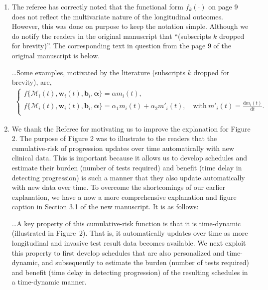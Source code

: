 \begin{enumerate}
\item \textbf{\color{blue}{The functional form $f_k(\cdot)$ on P9 does not reflect the multivariate nature of the longitudinal outcomes.}}

The referee has correctly noted that the functional form $f_k(\cdot)$ on page 9 does not reflect the multivariate nature of the longitudinal outcomes. However, this was done on purpose to keep the notation simple. Although we do notify the readers in the original manuscript that ``(subscripts $k$ dropped for brevity)''. The corresponding text in question from the page 9 of the original manuscript is below.
\begin{shadequote}
\ldots Some examples, motivated by the literature (subscripts $k$ dropped for brevity), are,
\begin{eqnarray*}
\left \{
\begin{array}{l}
f\big\{\mathcal{M}_{i}(t), \boldsymbol{w}_i(t), \boldsymbol{b}_{i}, \boldsymbol{\alpha} \big\} = \alpha m_{i}(t),\\
f\big\{ \mathcal{M}_{i}(t), \boldsymbol{w}_i(t), \boldsymbol{b}_{i}, \boldsymbol{\alpha}\big\} = \alpha_1 m_{i}(t) + \alpha_2 m'_{i}(t),\quad \text{with}\  m'_{i}(t) = \frac{\mathrm{d}{m_{i}(t)}}{\mathrm{d}{t}}.\\
\end{array}
\right.
\end{eqnarray*}
\end{shadequote}

\item \textbf{\color{blue}{Figure 2 is presented without explanation in the main text, besides what appears in the caption. Panel C has no mention even in the caption. It is unclear why it is presented and what message it delivers, if any.}}

We thank the Referee for motivating us to improve the explanation for Figure 2. The purpose of Figure 2 was to illustrate to the readers that the cumulative-risk of progression updates over time automatically with new clinical data. This is important because it allows us to develop schedules and estimate their burden (number of tests required) and benefit (time delay in detecting progression) is such a manner that they also update automatically with new data over time. To overcome the shortcomings of our earlier explanation, we have a now a more comprehensive explanation and figure caption in Section 3.1 of the new manuscript. It is as follows:

\begin{shadequote}
\ldots A key property of this cumulative-risk function is that it is time-dynamic (illustrated in Figure~2). That is, it automatically updates over time as more longitudinal and invasive test result data becomes available. We next exploit this property to first develop schedules that are also personalized and time-dynamic, and subsequently to estimate the burden (number of tests required) and benefit (time delay in detecting progression) of the resulting schedules in a time-dynamic manner. \\


\end{shadequote}
\end{enumerate}
